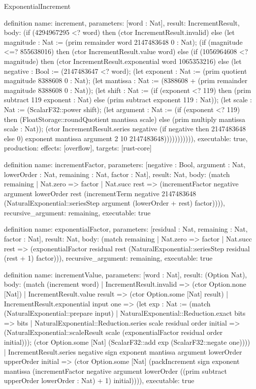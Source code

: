 \begin{lexlean}{ExponentialIncrement}
\begin{semanticmodule}
definition{
  name: increment,
  parameters: [word : Nat],
  result: IncrementResult,
  body: (if (4294967295 <? word) then (ctor IncrementResult.invalid) else
    (let magnitude : Nat := (prim remainder word 2147483648 0 : Nat);
      (if (magnitude <=? 855638016) then (ctor IncrementResult.value word) else
        (if (1056964608 <? magnitude) then (ctor IncrementResult.exponential word 1065353216) else
          (let negative : Bool := (2147483647 <? word);
            (let exponent : Nat := (prim quotient magnitude 8388608 0 : Nat);
              (let mantissa : Nat := (8388608 + (prim remainder magnitude 8388608 0 : Nat));
                (let shift : Nat := (if (exponent <? 119) then (prim subtract 119 exponent : Nat) else (prim subtract exponent 119 : Nat));
                  (let scale : Nat := (ScalarF32::power shift);
                    (let argument : Nat := (if (exponent <? 119) then (FloatStorage::roundQuotient mantissa scale) else (prim multiply mantissa scale : Nat));
                      (ctor IncrementResult.series negative (if negative then 2147483648 else 0) exponent mantissa argument 2 10 2147483648))))))))))),
  executable: true,
  production: {effects: [overflow], targets: [rust-core]}
}

definition{
  name: incrementFactor,
  parameters: [negative : Bool, argument : Nat, lowerOrder : Nat, remaining : Nat, factor : Nat],
  result: Nat,
  body: (match remaining
    | Nat.zero => factor
    | Nat.succ rest => (incrementFactor negative argument lowerOrder rest (incrementTerm negative 2147483648 (NaturalExponential::seriesStep argument (lowerOrder + rest) factor)))),
  recursive_argument: remaining,
  executable: true
}

definition{
  name: exponentialFactor,
  parameters: [residual : Nat, remaining : Nat, factor : Nat],
  result: Nat,
  body: (match remaining
    | Nat.zero => factor
    | Nat.succ rest => (exponentialFactor residual rest (NaturalExponential::seriesStep residual (rest + 1) factor))),
  recursive_argument: remaining,
  executable: true
}

definition{
  name: incrementValue,
  parameters: [word : Nat],
  result: (Option Nat),
  body: (match (increment word)
    | IncrementResult.invalid => (ctor Option.none [Nat])
    | IncrementResult.value result => (ctor Option.some [Nat] result)
    | IncrementResult.exponential input one => (let exp : Nat := (match (NaturalExponential::prepare input)
      | NaturalExponential::Reduction.exact bits => bits
      | NaturalExponential::Reduction.series scale residual order initial => (NaturalExponential::scaleResult scale (exponentialFactor residual order initial)));
      (ctor Option.some [Nat] (ScalarF32::add exp (ScalarF32::negate one))))
    | IncrementResult.series negative sign exponent mantissa argument lowerOrder upperOrder initial =>
      (ctor Option.some [Nat] (packIncrement sign exponent mantissa (incrementFactor negative argument lowerOrder ((prim subtract upperOrder lowerOrder : Nat) + 1) initial)))),
  executable: true
}


\end{semanticmodule}
\end{lexlean}
